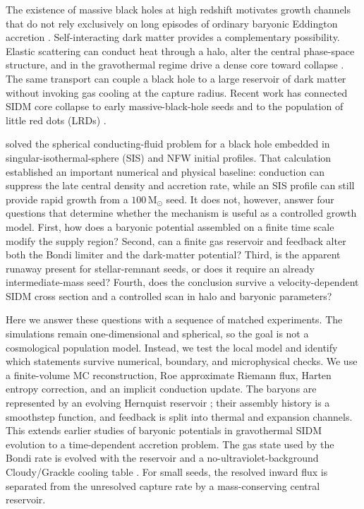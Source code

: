 \documentclass[11pt]{article}
\newcommand{\msun}{\,\mathrm{M}_{\odot}}
\begin{document}
The existence of massive black holes at high redshift motivates growth channels that do not rely exclusively on long episodes of ordinary baryonic Eddington accretion \citep{HaehneltRees1993,Salpeter1964,ShakuraSunyaev1973,BrommLoeb2003,MadauRees2001,Begelman2006,Volonteri2010,Inayoshi2020}.  Self-interacting dark matter provides a complementary possibility.  Elastic scattering can conduct heat through a halo, alter the central phase-space structure, and in the gravothermal regime drive a dense core toward collapse \citep{LyndenBellWood1968,SpergelSteinhardt2000,Balberg2002,KodaShapiro2011,Kaplinghat2016,TulinYu2018}.  The same transport can couple a black hole to a large reservoir of dark matter without invoking gas cooling at the capture radius.  Recent work has connected SIDM core collapse to early massive-black-hole seeds and to the population of little red dots (LRDs) \citep{Feng2021,Feng2025,Jiang2026}.

\citet{Meng2026} solved the spherical conducting-fluid problem for a black hole embedded in singular-isothermal-sphere (SIS) and NFW initial profiles.  That calculation established an important numerical and physical baseline: conduction can suppress the late central density and accretion rate, while an SIS profile can still provide rapid growth from a $100\msun$ seed.  It does not, however, answer four questions that determine whether the mechanism is useful as a controlled growth model.  First, how does a baryonic potential assembled on a finite time scale modify the supply region?  Second, can a finite gas reservoir and feedback alter both the Bondi limiter and the dark-matter potential?  Third, is the apparent runaway present for stellar-remnant seeds, or does it require an already intermediate-mass seed?  Fourth, does the conclusion survive a velocity-dependent SIDM cross section and a controlled scan in halo and baryonic parameters?

Here we answer these questions with a sequence of matched experiments.  The simulations remain one-dimensional and spherical, so the goal is not a cosmological population model.  Instead, we test the local model and identify which statements survive numerical, boundary, and microphysical checks.  We use a finite-volume MC reconstruction, Roe approximate Riemann flux, Harten entropy correction, and an implicit conduction update.  The baryons are represented by an evolving Hernquist reservoir \citep{Hernquist1990}; their assembly history is a smoothstep function, and feedback is split into thermal and expansion channels.  This extends earlier studies of baryonic potentials in gravothermal SIDM evolution \citep{Zhong2023} to a time-dependent accretion problem.  The gas state used by the Bondi rate is evolved with the reservoir and a no-ultraviolet-background Cloudy/Grackle cooling table \citep{Ferland2017,Smith2017}.  For small seeds, the resolved inward flux is separated from the unresolved capture rate by a mass-conserving central reservoir.
\end{document}

